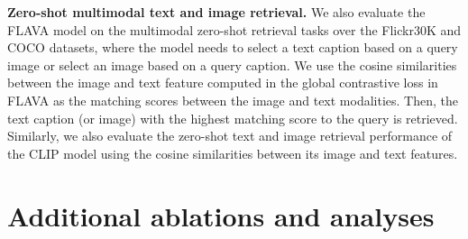 \documentclass[10pt,twocolumn,letterpaper]{article}
\newcommand{\myparagraph}[1]{\vspace{0.25em}\noindent\textbf{#1}}
\begin{document}
\myparagraph{Zero-shot multimodal text and image retrieval.} We also evaluate the FLAVA model on the multimodal zero-shot retrieval tasks over the Flickr30K and COCO datasets, where the model needs to select a text caption based on a query image or select an image based on a query caption. We use the cosine similarities between the image and text feature computed in the global contrastive loss in FLAVA as the matching scores between the image and text modalities. Then, the text caption (or image) with the highest matching score to the query is retrieved. Similarly, we also evaluate the zero-shot text and image retrieval performance of the CLIP model using the cosine similarities between its image and text features.

\section{Additional ablations and analyses}
\label{sec:supp_ablation}
\end{document}
